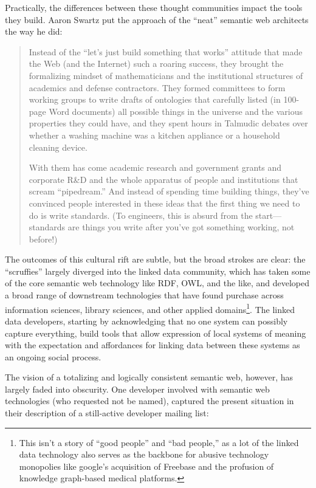\documentclass[notoc]{tufte-book}
\begin{document}
Practically, the differences between these thought communities impact
the tools they build. Aaron Swartz put the approach of the ``neat''
semantic web architects the way he did:

\begin{quote}
Instead of the ``let's just build something that works'' attitude that
made the Web (and the Internet) such a roaring success, they brought the
formalizing mindset of mathematicians and the institutional structures
of academics and defense contractors. They formed committees to form
working groups to write drafts of ontologies that carefully listed (in
100-page Word documents) all possible things in the universe and the
various properties they could have, and they spent hours in Talmudic
debates over whether a washing machine was a kitchen appliance or a
household cleaning device.

With them has come academic research and government grants and corporate
R\&D and the whole apparatus of people and institutions that scream
``pipedream.'' And instead of spending time building things, they've
convinced people interested in these ideas that the first thing we need
to do is write standards. (To engineers, this is absurd from the
start---standards are things you write after you've got something
working, not before!) \citep{swartzAaronSwartzProgrammable2013} 
\end{quote}

The outcomes of this cultural rift are subtle, but the broad strokes are
clear: the ``scruffies'' largely diverged into the linked data
community, which has taken some of the core semantic web technology like
RDF, OWL, and the like, and developed a broad range of downstream
technologies that have found purchase across information sciences,
library sciences, and other applied domains\footnote{This isn't a story
  of ``good people'' and ``bad people,'' as a lot of the linked data
  technology also serves as the backbone for abusive technology
  monopolies like google's acquisition of Freebase \citep{iainFreebaseDeadLong2019}  and the profusion of knowledge
  graph-based medical platforms.}. The linked data developers, starting
by acknowledging that no one system can possibly capture everything,
build tools that allow expression of local systems of meaning with the
expectation and affordances for linking data between these systems as an
ongoing social process.

The vision of a totalizing and logically consistent semantic web,
however, has largely faded into obscurity. One developer involved with
semantic web technologies (who requested not be named), captured the
present situation in their description of a still-active developer
mailing list:
\end{document}
